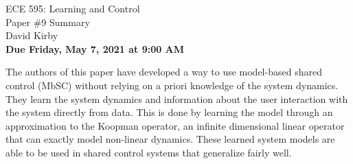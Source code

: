 \documentclass[11pt]{article}
\begin{document}
\begin{center}
\LARGE{ECE 595: Learning and Control\\Paper \#9 Summary}\\[1.5em]
\large David Kirby\\[1.5em]
\large \textbf{Due Friday, May 7, 2021 at 9:00 AM}\\[2.5em]
\end{center}

\noindent The authors of this paper have developed a way to use model-based shared control (MbSC) without relying on a priori knowledge of the system dynamics. They learn the system dynamics and information about the user interaction with the system directly from data. This is done by learning the model through an approximation to the Koopman operator, an infinite dimensional linear operator that can exactly model non-linear dynamics. These learned system models are able to be used in shared control systems that generalize fairly well.
\end{document}
